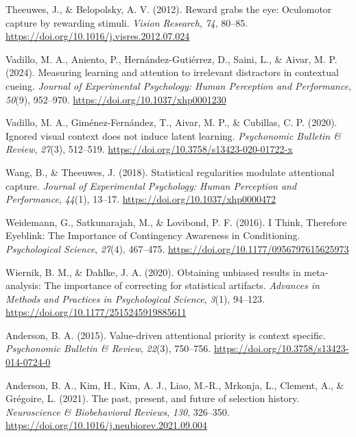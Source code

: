 \documentclass[
  jou,
  floatsintext,
  longtable,
  nolmodern,
  notxfonts,
  notimes,
  colorlinks=true,linkcolor=blue,citecolor=blue,urlcolor=blue]{apa7}
\newlength{\cslhangindent}
\newenvironment{CSLReferences}[2] %
 {\begin{list}{}{%
  \setlength{\itemindent}{0pt}
  \setlength{\leftmargin}{0pt}
  \setlength{\parsep}{0pt}
  \ifodd #1
   \setlength{\leftmargin}{\cslhangindent}
   \setlength{\itemindent}{-1\cslhangindent}
  \fi
  \setlength{\itemsep}{#2\baselineskip}}}
 {\end{list}}
\begin{document}
\begin{CSLReferences}{1}{0}
Theeuwes, J., \& Belopolsky, A. V. (2012). Reward grabs the eye:
Oculomotor capture by rewarding stimuli. \emph{Vision Research},
\emph{74}, 80--85. \url{https://doi.org/10.1016/j.visres.2012.07.024}

Vadillo, M. A., Aniento, P., Hernández-Gutiérrez, D., Saini, L., \&
Aivar, M. P. (2024). Measuring learning and attention to irrelevant
distractors in contextual cueing. \emph{Journal of Experimental
Psychology: Human Perception and Performance}, \emph{50}(9), 952--970.
\url{https://doi.org/10.1037/xhp0001230}

Vadillo, M. A., Giménez-Fernández, T., Aivar, M. P., \& Cubillas, C. P.
(2020). Ignored visual context does not induce latent learning.
\emph{Psychonomic Bulletin \& Review}, \emph{27}(3), 512--519.
\url{https://doi.org/10.3758/s13423-020-01722-x}

Wang, B., \& Theeuwes, J. (2018). Statistical regularities modulate
attentional capture. \emph{Journal of Experimental Psychology: Human
Perception and Performance}, \emph{44}(1), 13--17.
\url{https://doi.org/10.1037/xhp0000472}

Weidemann, G., Satkunarajah, M., \& Lovibond, P. F. (2016). I Think,
Therefore Eyeblink: The Importance of Contingency Awareness in
Conditioning. \emph{Psychological Science}, \emph{27}(4), 467--475.
\url{https://doi.org/10.1177/0956797615625973}

Wiernik, B. M., \& Dahlke, J. A. (2020). Obtaining unbiased results in
meta-analysis: The importance of correcting for statistical artifacts.
\emph{Advances in Methods and Practices in Psychological Science},
\emph{3}(1), 94--123. \url{https://doi.org/10.1177/2515245919885611}

Anderson, B. A. (2015). Value-driven attentional priority is context
specific. \emph{Psychonomic Bulletin \& Review}, \emph{22}(3), 750--756.
\url{https://doi.org/10.3758/s13423-014-0724-0}

Anderson, B. A., Kim, H., Kim, A. J., Liao, M.-R., Mrkonja, L., Clement,
A., \& Grégoire, L. (2021). The past, present, and future of selection
history. \emph{Neuroscience \& Biobehavioral Reviews}, \emph{130},
326--350. \url{https://doi.org/10.1016/j.neubiorev.2021.09.004}


\end{CSLReferences}
\end{document}
